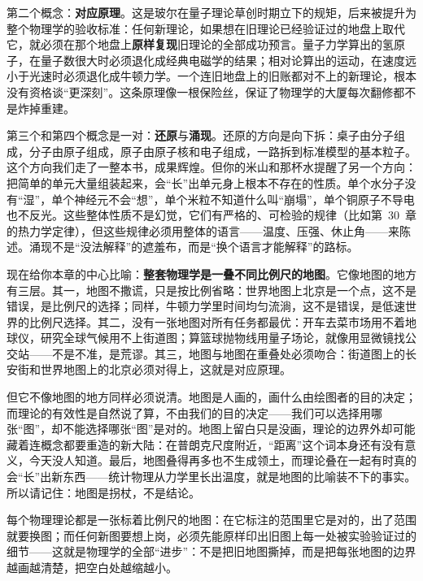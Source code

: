 第二个概念：\textbf{对应原理}。这是玻尔在量子理论草创时期立下的规矩，后来被提升为整个物理学的验收标准：任何新理论，如果想在旧理论已经验证过的地盘上取代它，就必须在那个地盘上\textbf{原样复现}旧理论的全部成功预言。量子力学算出的氢原子，在量子数很大时必须退化成经典电磁学的结果；相对论算出的运动，在速度远小于光速时必须退化成牛顿力学。一个连旧地盘上的旧账都对不上的新理论，根本没有资格谈“更深刻”。这条原理像一根保险丝，保证了物理学的大厦每次翻修都不是炸掉重建。

第三个和第四个概念是一对：\textbf{还原}与\textbf{涌现}。还原的方向是向下拆：桌子由分子组成，分子由原子组成，原子由原子核和电子组成，一路拆到标准模型的基本粒子。这个方向我们走了一整本书，成果辉煌。但你的米山和那杯水提醒了另一个方向：把简单的单元大量组装起来，会“长”出单元身上根本不存在的性质。单个水分子没有“湿”，单个神经元不会“想”，单个米粒不知道什么叫“崩塌”，单个铜原子不导电也不反光。这些整体性质不是幻觉，它们有严格的、可检验的规律（比如第~30~章的热力学定律），但这些规律必须用整体的语言——温度、压强、休止角——来陈述。涌现不是“没法解释”的遮羞布，而是“换个语言才能解释”的路标。

现在给你本章的中心比喻：\textbf{整套物理学是一叠不同比例尺的地图}。它像地图的地方有三层。其一，地图不撒谎，只是按比例省略：世界地图上北京是一个点，这不是错误，是比例尺的选择；同样，牛顿力学里时间均匀流淌，这不是错误，是低速世界的比例尺选择。其二，没有一张地图对所有任务都最优：开车去菜市场用不着地球仪，研究全球气候用不上街道图；算篮球抛物线用量子场论，就像用显微镜找公交站——不是不准，是荒谬。其三，地图与地图在重叠处必须吻合：街道图上的长安街和世界地图上的北京必须对得上，这就是对应原理。

但它不像地图的地方同样必须说清。地图是人画的，画什么由绘图者的目的决定；而理论的有效性是自然说了算，不由我们的目的决定——我们可以选择用哪张“图”，却不能选择哪张“图”是对的。地图上留白只是没画，理论的边界外却可能藏着连概念都要重造的新大陆：在普朗克尺度附近，“距离”这个词本身还有没有意义，今天没人知道。最后，地图叠得再多也不生成领土，而理论叠在一起有时真的会“长”出新东西——统计物理从力学里长出温度，就是地图的比喻装不下的事实。所以请记住：地图是拐杖，不是结论。


\begin{oneline}
每个物理理论都是一张标着比例尺的地图：在它标注的范围里它是对的，出了范围就要换图；而任何新图要想上岗，必须先能原样印出旧图上每一处被实验验证过的细节——这就是物理学的全部“进步”：不是把旧地图撕掉，而是把每张地图的边界越画越清楚，把空白处越缩越小。
\end{oneline}

